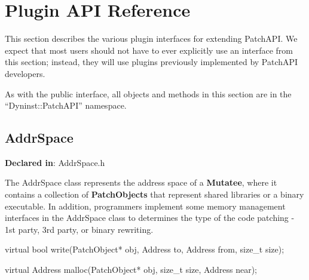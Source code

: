 \section{Plugin API Reference}
\label{sec-plugin-api}

This section describes the various plugin interfaces for extending
PatchAPI. We expect that most users should not have to ever explicitly
use an interface from this section; instead, they will use plugins
previously implemented by PatchAPI developers. 

As with the public interface, all objects and methods in this section
are in the ``Dyninst::PatchAPI'' namespace. 

\subsection{AddrSpace}
\label{sec-3.2.1}

\textbf{Declared in}: AddrSpace.h

The AddrSpace class represents the address space of a \textbf{Mutatee}, where it
contains a collection of \textbf{PatchObjects} that represent shared libraries or a
binary executable. In addition, programmers implement some memory management
interfaces in the AddrSpace class to determines the type of the code patching -
1st party, 3rd party, or binary rewriting.


\begin{apient}
virtual bool write(PatchObject* obj, Address to, Address from, size_t size);
\end{apient}



\begin{apient}
virtual Address malloc(PatchObject* obj, size_t size, Address near);
\end{apient}



